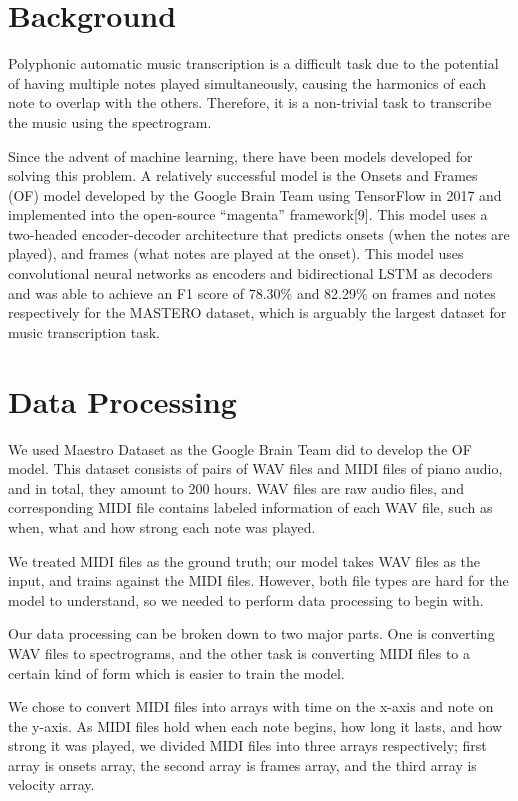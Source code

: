 \documentclass[a4paper,twocolumn,10pt]{article}
\begin{document}
\section{Background}
Polyphonic automatic music transcription is a difficult task due to the potential of having multiple notes played simultaneously, causing the harmonics of each note to overlap with the others. Therefore, it is a non-trivial task to transcribe the music using the spectrogram. 

Since the advent of machine learning, there have been models developed for solving this problem. A relatively successful model is the Onsets and Frames (OF) model developed by the Google Brain Team using TensorFlow in 2017 and implemented into the open-source “magenta” framework[9]. This model uses a two-headed encoder-decoder architecture that predicts onsets (when the notes are played), and frames (what notes are played at the onset). This model uses convolutional neural networks as encoders and bidirectional LSTM as decoders and was able to achieve an F1 score of 78.30\% and 82.29\% on frames and notes respectively for the MASTERO dataset, which is arguably the largest dataset for music transcription task.

\section{Data Processing}
We used Maestro Dataset as the Google Brain Team did to develop the OF model. This dataset consists of pairs of WAV files and MIDI files of piano audio, and in total, they amount to 200 hours.
WAV files are raw audio files, and corresponding MIDI file contains labeled information of each WAV file, such as when, what and how strong each note was played.

We treated MIDI files as the ground truth; our model takes WAV files as the input, and trains against the MIDI files. However, both file types are hard for the model to understand, so we needed to perform data processing to begin with.

Our data processing can be broken down to two major parts. One is converting WAV files to spectrograms, and the other task is converting MIDI files to a certain kind of form which is easier to train the model.

We chose to convert MIDI files into arrays with time on the x-axis and note on the y-axis. As MIDI files hold when each note begins, how long it lasts, and how strong it was played, we divided MIDI files into three arrays respectively; first array is onsets array, the second array is frames array, and the third array is velocity array.
\end{document}
